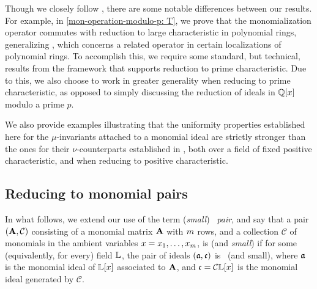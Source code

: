 \documentclass{article}
\begin{document}
Though we closely follow \cite{budur+mustata+saito.roots_bs_polys_monomial}, there are some notable differences between our results.   For example, in \cref{mon-operation-modulo-p: T}, we prove that the monomialization operator commutes with reduction to large characteristic in polynomial rings, generalizing \cite[Lemma 6.2]{budur+mustata+saito.roots_bs_polys_monomial}, which concerns a related operator in certain localizations of polynomial rings.  To accomplish this, we require some standard, but technical, results from the framework that supports reduction to prime characteristic.
Due to this, we also choose to work in greater generality when reducing to prime characteristic, as opposed to simply discussing the reduction of ideals in $\mathbb{Q}[x]$ modulo a prime $p$.


We also provide examples illustrating that the uniformity properties established here for the $\mu$-invariants attached to a monomial ideal are strictly stronger than the ones for their $\nu$-counterparts established in \loccit, both over a field of fixed positive characteristic, and when reducing to positive characteristic.  

\subsection{Reducing to monomial pairs}

In what follows, we extend our use of the term (\emph{small}) \emph{\compatible\ pair}, and say that a pair $(\mathbf{A}, \mathcal{C})$ consisting of a monomial matrix $\mathbf{A}$ with $m$ rows, and a collection $\mathcal{C}$ of monomials in the ambient variables $x = x_1, \ldots, x_{m}$, is \emph{\compatible} (and \emph{small}) if for some (equivalently, for every) field $\mathbb{L}$, the pair of ideals $(\mathfrak{a}, \mathfrak{c})$ is  \compatible\ (and small),  where $\mathfrak{a}$ is the monomial ideal of $\mathbb{L}[x]$ associated to $\mathbf{A}$, and $\mathfrak{c} = \mathcal{C} \mathbb{L}[x]$ is the monomial ideal generated by $\mathcal{C}$.
\end{document}
